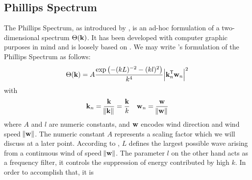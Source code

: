 \subsection{Phillips Spectrum}
\label{sec:phillips_spectrum}
%
The Phillips Spectrum, as introduced by \cite{course:simulatingocean},
is an ad-hoc formulation of a two-dimensional \wavenumber spectrum $\Theta(\mathbf{k})$.
It has been developed with computer graphic purposes in mind and is loosely
based on \citet{article:Phillips1958,article:Phillips1985}.
We may write \citeauthor{course:simulatingocean}'s
formulation of the Phillips Spectrum as follows:
%
\begin{equation}
\label{eq:phillips_spectrum}
 \Theta(\mathbf{k}) = A\frac{\exp\left(-(kL)^{-2}-(kl)^2\right)}{k^4}\abs{\mathbf{k}_n^{\mathsf{T}}\mathbf{w}_n}^2
\end{equation}
with
\begin{align*}
 \mathbf{k}_n = \frac{\mathbf{k}}{\norm{\mathbf{k}}} = \frac{\mathbf{k}}{k} && \mathbf{w}_n = \frac{\mathbf{w}}{\norm{\mathbf{w}}}
\end{align*}
% 
% 
%
where $A$ and $l$ are numeric constants, and $\mathbf{w}$ encodes wind 
direction and wind speed $\norm{\mathbf{w}}$. The numeric constant $A$ represents 
a scaling factor which we will discuss at a later point.  According to 
\citeauthor{course:simulatingocean}, $L$ defines the largest possible wave
arising from a continuous wind of speed $\norm{\mathbf{w}}$. The parameter $l$ on 
the other hand acts as a frequency filter, it controls the suppression of energy
contributed by high \wavenumbers $k$. In order to accomplish that, it is
